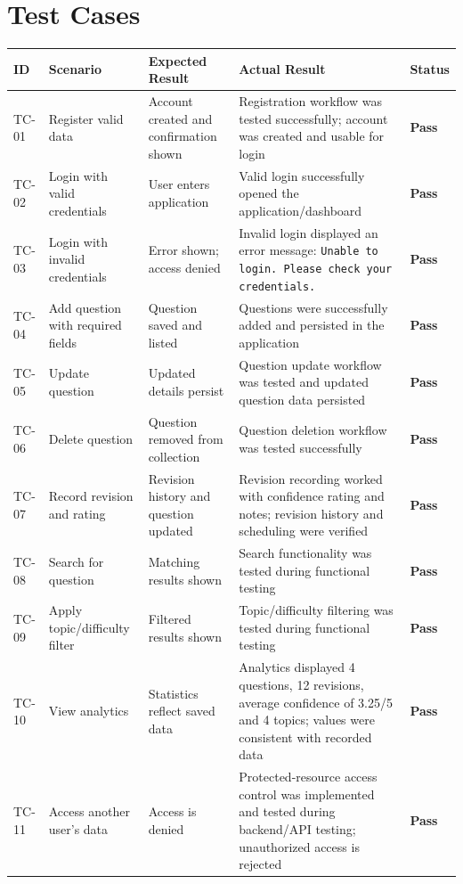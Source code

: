 \documentclass[12pt,a4paper]{report}
\begin{document}
\section{Test Cases}
\begin{longtable}{|p{}|p{}|p{}|p{}|p{}|}
\hline
\textbf{ID} & \textbf{Scenario} & \textbf{Expected Result} & \textbf{Actual Result} & \textbf{Status}\\\hline
TC-01 & Register valid data & Account created and confirmation shown & Registration workflow was tested successfully; account was created and usable for login & \textbf{Pass}\\\hline
TC-02 & Login with valid credentials & User enters application & Valid login successfully opened the application/dashboard & \textbf{Pass}\\\hline
TC-03 & Login with invalid credentials & Error shown; access denied & Invalid login displayed an error message: \texttt{Unable to login. Please check your credentials.} & \textbf{Pass}\\\hline
TC-04 & Add question with required fields & Question saved and listed & Questions were successfully added and persisted in the application & \textbf{Pass}\\\hline
TC-05 & Update question & Updated details persist & Question update workflow was tested and updated question data persisted & \textbf{Pass}\\\hline
TC-06 & Delete question & Question removed from collection & Question deletion workflow was tested successfully & \textbf{Pass}\\\hline
TC-07 & Record revision and rating & Revision history and question updated & Revision recording worked with confidence rating and notes; revision history and scheduling were verified & \textbf{Pass}\\\hline
TC-08 & Search for question & Matching results shown & Search functionality was tested during functional testing & \textbf{Pass}\\\hline
TC-09 & Apply topic/difficulty filter & Filtered results shown & Topic/difficulty filtering was tested during functional testing & \textbf{Pass}\\\hline
TC-10 & View analytics & Statistics reflect saved data & Analytics displayed 4 questions, 12 revisions, average confidence of 3.25/5 and 4 topics; values were consistent with recorded data & \textbf{Pass}\\\hline
TC-11 & Access another user's data & Access is denied & Protected-resource access control was implemented and tested during backend/API testing; unauthorized access is rejected & \textbf{Pass}\\\hline
\end{longtable}
\end{document}
